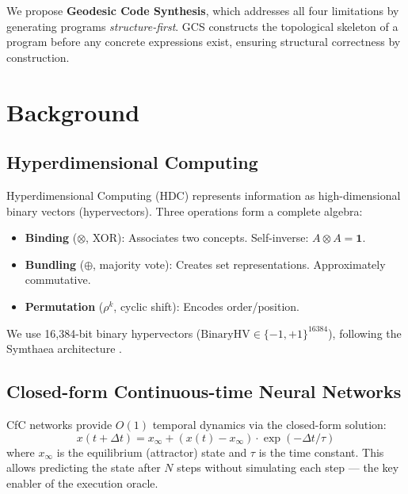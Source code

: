\documentclass[11pt,a4paper]{article}
\begin{document}
We propose \textbf{Geodesic Code Synthesis}, which addresses all four limitations
by generating programs \emph{structure-first}. GCS constructs the topological skeleton
of a program before any concrete expressions exist, ensuring structural correctness
by construction.

\section{Background}

\subsection{Hyperdimensional Computing}

Hyperdimensional Computing (HDC) \cite{kanerva2009hyperdimensional} represents
information as high-dimensional binary vectors (hypervectors). Three operations
form a complete algebra:
\begin{itemize}
    \item \textbf{Binding} ($\otimes$, XOR): Associates two concepts. Self-inverse:
    $A \otimes A = \mathbf{1}$.
    \item \textbf{Bundling} ($\oplus$, majority vote): Creates set representations.
    Approximately commutative.
    \item \textbf{Permutation} ($\rho^k$, cyclic shift): Encodes order/position.
\end{itemize}

We use 16,384-bit binary hypervectors ($\text{BinaryHV} \in \{-1, +1\}^{16384}$),
following the Symthaea architecture \cite{stoltz2026symthaea}.

\subsection{Closed-form Continuous-time Neural Networks}

CfC networks \cite{hasani2021liquid} provide $O(1)$ temporal dynamics via the
closed-form solution:
\begin{equation}
    x(t + \Delta t) = x_\infty + (x(t) - x_\infty) \cdot \exp(-\Delta t / \tau)
\end{equation}
where $x_\infty$ is the equilibrium (attractor) state and $\tau$ is the time constant.
This allows predicting the state after $N$ steps without simulating each step —
the key enabler of the execution oracle.
\end{document}
